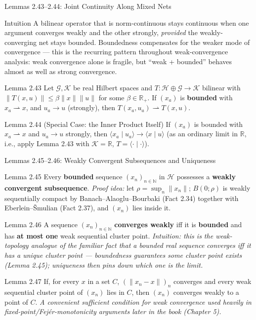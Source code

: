 \documentclass[aspectratio=169,10pt]{beamer}
\newcommand{\R}{\mathbb{R}}
\newcommand{\N}{\mathbb{N}}
\newcommand{\Hil}{\mathcal{H}}
\newcommand{\Kil}{\mathcal{K}}
\newcommand{\wto}{\rightharpoonup}
\newcommand{\ip}[2]{\langle #1 \mid #2 \rangle}
\begin{document}
\begin{frame}{Lemmas 2.43--2.44: Joint Continuity Along Mixed Nets}
  \begin{block}{Intuition}
    A bilinear operator that is norm-continuous stays continuous when one
    argument converges weakly and the other strongly, \emph{provided} the
    weakly-converging net stays bounded. Boundedness compensates for the
    weaker mode of convergence --- this is the recurring pattern throughout
    weak-convergence analysis: weak convergence alone is fragile, but
    ``weak + bounded'' behaves almost as well as strong convergence.
  \end{block}

  \begin{block}{Lemma 2.43}
    Let $\mathcal G,\Kil$ be real Hilbert spaces and $T:\Hil\oplus\mathcal
    G\to\Kil$ bilinear with $\|T(x,u)\|\le\beta\|x\|\|u\|$ for some
    $\beta\in\R_+$. If $(x_a)$ is \textbf{bounded} with $x_a\wto x$, and
    $u_a\to u$ (strongly), then $T(x_a,u_a)\wto T(x,u)$.
  \end{block}

  \begin{block}{Lemma 2.44 (Special Case: the Inner Product Itself)}
    If $(x_a)$ is bounded with $x_a\wto x$ and $u_a\to u$ strongly, then
    $\ip{x_a}{u_a}\to\ip{x}{u}$ (as an ordinary limit in $\R$, i.e., apply
    Lemma 2.43 with $\Kil=\R$, $T=\ip{\cdot}{\cdot}$).
  \end{block}
\end{frame}

\begin{frame}{Lemmas 2.45--2.46: Weakly Convergent Subsequences and Uniqueness}
  \begin{block}{Lemma 2.45}
    Every \textbf{bounded} sequence $(x_n)_{n\in\N}$ in $\Hil$ possesses a
    \textbf{weakly convergent subsequence}. \textit{Proof idea:} let $\rho =
    \sup_n\|x_n\|$; $B(0;\rho)$ is weakly sequentially compact by
    Banach--Alaoglu--Bourbaki (Fact 2.34) together with Eberlein--\v Smulian
    (Fact 2.37), and $(x_n)$ lies inside it.
  \end{block}

  \begin{block}{Lemma 2.46}
    A sequence $(x_n)_{n\in\N}$ \textbf{converges weakly} iff it is
    \textbf{bounded} and has \textbf{at most one} weak sequential cluster
    point. \textit{Intuition: this is the weak-topology analogue of the
    familiar fact that a bounded real sequence converges iff it has a
    unique cluster point --- boundedness guarantees \emph{some} cluster
    point exists (Lemma 2.45); uniqueness then pins down which one is the
    limit.}
  \end{block}

  \begin{block}{Lemma 2.47}
    If, for every $x$ in a set $C$, $(\|x_n-x\|)_n$ converges and every weak
    sequential cluster point of $(x_n)$ lies in $C$, then $(x_n)$ converges
    weakly to a point of $C$. \textit{A convenient sufficient condition for
    weak convergence used heavily in fixed-point/Fej\'er-monotonicity
    arguments later in the book (Chapter 5).}
  \end{block}
\end{frame}
\end{document}
